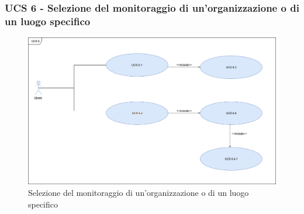 \subsubsection{UCS 6 - Selezione del monitoraggio di un'organizzazione o di un luogo specifico}%

\begin{figure}[h]
\centering
\includegraphics[scale=0.3]{sezioni/UseCase/Immagini/UCS6.png}
\caption{Selezione del monitoraggio di un'organizzazione o di un luogo specifico}
\end{figure}

